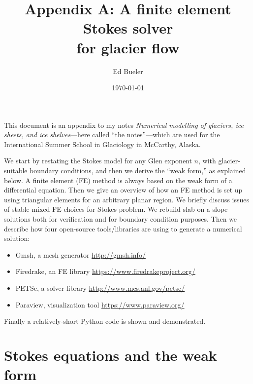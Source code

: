 \documentclass[letterpaper,final,12pt,reqno]{amsart}
\begin{document}
\graphicspath{{../figures/}}

\title{Appendix A: A finite element Stokes solver \\ for glacier flow}

\author{Ed Bueler}

\date{\today}

\maketitle

\renewcommand{\theequation}{A\arabic{equation}}


This document is an appendix to my notes \emph{Numerical modelling of glaciers, ice sheets, and ice shelves}---here called ``the notes''---which are used for the International Summer School in Glaciology in McCarthy, Alaska.

We start by restating the Stokes model for any Glen exponent $n$, with glacier-suitable boundary conditions, and then we derive the ``weak form,'' as explained below.  A finite element (FE) method \cite{Elmanetal2014} is always based on the weak form of a differential equation.  Then we give an overview of how an FE method is set up using triangular elements for an arbitrary planar region.  We briefly discuss issues of stable mixed FE choices for Stokes problem.  We rebuild slab-on-a-slope solutions both for verification and for boundary condition purposes.  Then we describe how four open-source tools/libraries are using to generate a numerical solution:
\begin{itemize}
\item Gmsh, a mesh generator \hfill \url{http://gmsh.info/}
\item Firedrake, an FE library \hfill \url{https://www.firedrakeproject.org/}
\item PETSc, a solver library \hfill \url{http://www.mcs.anl.gov/petsc/}
\item Paraview, visualization tool \hfill \url{https://www.paraview.org/}
\end{itemize}
Finally a relatively-short Python code is shown and demonstrated.

\section{Stokes equations and the weak form}
\end{document}

